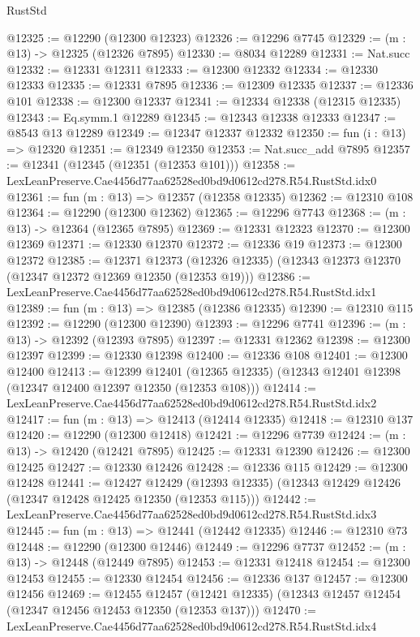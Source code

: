 \begin{lexlean}{RustStd}
\begin{coremodule}
@12325 := @12290 (@12300 @12323)
@12326 := @12296 @7745
@12329 := (m : @13) -> @12325 (@12326 @7895)
@12330 := @8034 @12289
@12331 := Nat.succ
@12332 := @12331 @12311
@12333 := @12300 @12332
@12334 := @12330 @12333
@12335 := @12331 @7895
@12336 := @12309 @12335
@12337 := @12336 @101
@12338 := @12300 @12337
@12341 := @12334 @12338 (@12315 @12335)
@12343 := Eq.symm.{1} @12289
@12345 := @12343 @12338 @12333
@12347 := @8543 @13 @12289
@12349 := @12347 @12337 @12332
@12350 := fun (i : @13) => @12320
@12351 := @12349 @12350
@12353 := Nat.succ_add @7895
@12357 := @12341 (@12345 (@12351 (@12353 @101)))
@12358 := LexLeanPreserve.Cae4456d77aa62528ed0bd9d0612cd278.R54.RustStd.idx0
@12361 := fun (m : @13) => @12357 (@12358 @12335)
@12362 := @12310 @108
@12364 := @12290 (@12300 @12362)
@12365 := @12296 @7743
@12368 := (m : @13) -> @12364 (@12365 @7895)
@12369 := @12331 @12323
@12370 := @12300 @12369
@12371 := @12330 @12370
@12372 := @12336 @19
@12373 := @12300 @12372
@12385 := @12371
    @12373
    (@12326 @12335)
    (@12343 @12373 @12370 (@12347 @12372 @12369 @12350 (@12353 @19)))
@12386 := LexLeanPreserve.Cae4456d77aa62528ed0bd9d0612cd278.R54.RustStd.idx1
@12389 := fun (m : @13) => @12385 (@12386 @12335)
@12390 := @12310 @115
@12392 := @12290 (@12300 @12390)
@12393 := @12296 @7741
@12396 := (m : @13) -> @12392 (@12393 @7895)
@12397 := @12331 @12362
@12398 := @12300 @12397
@12399 := @12330 @12398
@12400 := @12336 @108
@12401 := @12300 @12400
@12413 := @12399
    @12401
    (@12365 @12335)
    (@12343 @12401 @12398 (@12347 @12400 @12397 @12350 (@12353 @108)))
@12414 := LexLeanPreserve.Cae4456d77aa62528ed0bd9d0612cd278.R54.RustStd.idx2
@12417 := fun (m : @13) => @12413 (@12414 @12335)
@12418 := @12310 @137
@12420 := @12290 (@12300 @12418)
@12421 := @12296 @7739
@12424 := (m : @13) -> @12420 (@12421 @7895)
@12425 := @12331 @12390
@12426 := @12300 @12425
@12427 := @12330 @12426
@12428 := @12336 @115
@12429 := @12300 @12428
@12441 := @12427
    @12429
    (@12393 @12335)
    (@12343 @12429 @12426 (@12347 @12428 @12425 @12350 (@12353 @115)))
@12442 := LexLeanPreserve.Cae4456d77aa62528ed0bd9d0612cd278.R54.RustStd.idx3
@12445 := fun (m : @13) => @12441 (@12442 @12335)
@12446 := @12310 @73
@12448 := @12290 (@12300 @12446)
@12449 := @12296 @7737
@12452 := (m : @13) -> @12448 (@12449 @7895)
@12453 := @12331 @12418
@12454 := @12300 @12453
@12455 := @12330 @12454
@12456 := @12336 @137
@12457 := @12300 @12456
@12469 := @12455
    @12457
    (@12421 @12335)
    (@12343 @12457 @12454 (@12347 @12456 @12453 @12350 (@12353 @137)))
@12470 := LexLeanPreserve.Cae4456d77aa62528ed0bd9d0612cd278.R54.RustStd.idx4

\end{coremodule}
\end{lexlean}

